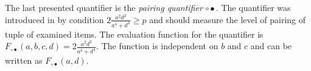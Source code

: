 
The last presented quantifier is the {\it pairing quantifier \/} 
$ \circ\bullet $. The quantifier was introduced in \cite{Kupka} by condition
$2\frac{a^{2}d^{2}}{a^{4}+d^{4}} \geq p$
and should measure the level of pairing of tuple of examined items. The evaluation
function for the quantifier is 
$F_{\circ\bullet}(a,b,c,d) = 2\frac{a^{2}d^{2}}{a^{4}+d^{4}}$. The function is
independent on $b$ and $c$ and can be written as $F_{\circ\bullet}(a,d)$.
